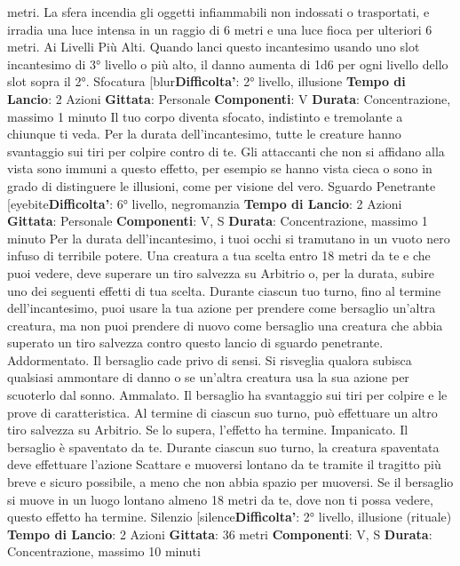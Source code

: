 \begin{multicols}{2}
metri. La sfera incendia gli oggetti infiammabili non
indossati o trasportati, e irradia una luce intensa in un
raggio di 6 metri e una luce fioca per ulteriori 6 metri.
Ai Livelli Più Alti. Quando lanci questo incantesimo
usando uno slot incantesimo di 3° livello o più alto, il
danno aumenta di 1d6 per ogni livello dello slot sopra il
2°.
Sfocatura
[blur\textbf{Difficolta'}:
2° livello, illusione
\textbf{Tempo di Lancio}: 2 Azioni
\textbf{Gittata}: Personale
\textbf{Componenti}: V
\textbf{Durata}: Concentrazione, massimo 1 minuto
Il tuo corpo diventa sfocato, indistinto e tremolante a
chiunque ti veda. Per la durata dell’incantesimo, tutte le
creature hanno svantaggio sui tiri per colpire contro di
te. Gli attaccanti che non si affidano alla vista sono
immuni a questo effetto, per esempio se hanno vista
cieca o sono in grado di distinguere le illusioni, come
per visione del vero.
Sguardo Penetrante
[eyebite\textbf{Difficolta'}:
6° livello, negromanzia
\textbf{Tempo di Lancio}: 2 Azioni
\textbf{Gittata}: Personale
\textbf{Componenti}: V, S
\textbf{Durata}: Concentrazione, massimo 1 minuto
Per la durata dell’incantesimo, i tuoi occhi si tramutano
in un vuoto nero infuso di terribile potere. Una creatura
a tua scelta entro 18 metri da te e che puoi vedere,
deve superare un tiro salvezza su Arbitrio o, per la
durata, subire uno dei seguenti effetti di tua scelta.
Durante ciascun tuo turno, fino al termine
dell’incantesimo, puoi usare la tua azione per prendere
come bersaglio un’altra creatura, ma non puoi prendere
di nuovo come bersaglio una creatura che abbia
superato un tiro salvezza contro questo lancio di
sguardo penetrante.
Addormentato. Il bersaglio cade privo di sensi. Si
risveglia qualora subisca qualsiasi ammontare di danno
o se un’altra creatura usa la sua azione per scuoterlo
dal sonno.
Ammalato. Il bersaglio ha svantaggio sui tiri per colpire
e le prove di caratteristica. Al termine di ciascun suo
turno, può effettuare un altro tiro salvezza su Arbitrio.
Se lo supera, l’effetto ha termine.
Impanicato. Il bersaglio è spaventato da te. Durante
ciascun suo turno, la creatura spaventata deve
effettuare l’azione Scattare e muoversi lontano da te
tramite il tragitto più breve e sicuro possibile, a meno
che non abbia spazio per muoversi. Se il bersaglio si
muove in un luogo lontano almeno 18 metri da te, dove
non ti possa vedere, questo effetto ha termine.
Silenzio
[silence\textbf{Difficolta'}:
2° livello, illusione (rituale)
\textbf{Tempo di Lancio}: 2 Azioni
\textbf{Gittata}: 36 metri
\textbf{Componenti}: V, S
\textbf{Durata}: Concentrazione, massimo 10 minuti

\end{multicols}
